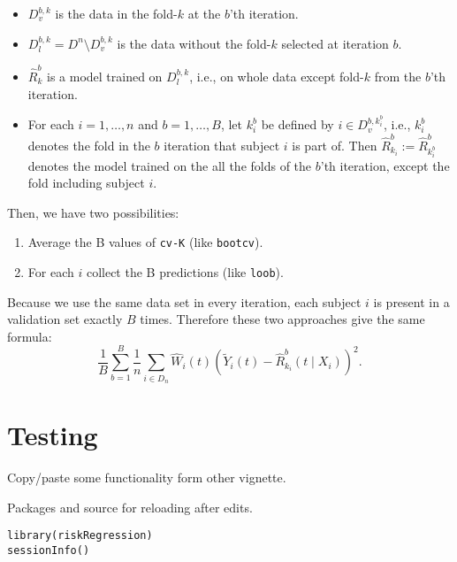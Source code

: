 \documentclass{article}
\begin{document}
\begin{itemize}
\item \(D_v^{b,k}\) is the data in the fold-\(k\) at the \(b\)'th iteration.
\item \(D_l^{b, k} = D^n \setminus D_v^{b,k}\)  is the data
without the fold-\(k\) selected at iteration \(b\).
\item \(\hat{R}^b_k\) is a model trained on \(D_l^{b, k}\), i.e., on whole
data except fold-\(k\) from the \(b\)'th iteration.
\item For each \(i = 1, \dots, n\) and \(b = 1, \dots, B\), let \(k_i^b\) be
defined by \(i \in D^{b, k_i^b}_v\), i.e., \(k_i^b\) denotes the fold in
the \(b\) iteration that subject \(i\) is part of. Then \(\hat{R}^b_{k_i} :=
  \hat{R}^b_{k^b_i}\) denotes the model trained on the all the folds of the
\(b\)'th iteration, except the fold including subject \(i\).
\end{itemize}

Then, we have two
possibilities:

\begin{enumerate}
\item Average the B values of \texttt{cv-K} (like \texttt{bootcv}).
\item For each \(i\) collect the B predictions (like \texttt{loob}).
\end{enumerate}

Because we use the same data set in every iteration, each subject \(i\)
is present in a validation set exactly \(B\) times. Therefore these two
approaches give the same formula:
\begin{equation*}
  \frac{1}{B}\sum_{b=1}^{B}\frac{1}{n}\sum_{i \in D_n} \hat{W}_i(t)
  \left ( \tilde{Y}_i(t) - \hat{R}_{k_i}^b(t \mid X_i)  \right)^2 .
\end{equation*}


\section{Testing}
\label{sec:orgee1284b}
Copy/paste some functionality form other vignette.

Packages and source for reloading after edits.
\lstset{language=r,label= ,caption= ,captionpos=b,numbers=none}
\begin{lstlisting}
library(riskRegression)
sessionInfo()
\end{lstlisting}
\end{document}
